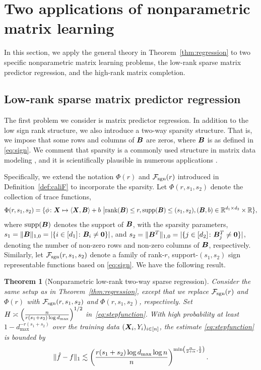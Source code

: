 \documentclass[aos]{imsart}
\newtheorem{theorem}{Theorem}%
\theoremstyle{definition}
\def\caliF{\tF_{\textup{sgn}}}
\begin{document}
\section{Two applications of nonparametric matrix learning}
\label{sec:examples}

In this section, we apply the general theory in Theorem~\ref{thm:regression} to two specific nonparametric matrix learning problems, the low-rank sparse matrix predictor regression, and the high-rank matrix completion. 



\subsection{Low-rank sparse matrix predictor regression}
\label{sec:sparse}

The first problem we consider is matrix predictor regression. In addition to the low sign rank structure, we also introduce a two-way sparsity structure. That is, we impose that some rows and columns of $\bm B$ are zeros, where $\bm B$ is as defined in \eqref{eq:sign}. We comment that sparsity is a commonly used structure in matrix data modeling \citep{zhou2014regularized}, and it is scientifically plausible in numerous applications \citep{Zhang2015}.

Specifically, we extend the notation $\Phi(r)$ and $\caliF(r)$ introduced in Definition~\ref{def:caliF} to incorporate the sparsity. Let $\Phi(r,s_1,s_2)$ denote the collection of trace functions, 
\begin{align*} 
\Phi(r,s_1,s_2)=\{\phi\colon \mX\mapsto \langle \mX, \mB \rangle +b \ \big| \text{rank}(\mB)\leq r,  \text{supp}(\mB)\leq (s_1,s_2), (\mB,b)\in\mathbb{R}^{d_1\times d_2}\times \mathbb{R}\},
\end{align*}
where $\text{supp}(\bm B)$ denotes the support of $\bm B$, with the sparsity parameters, $s_1=\lVert\bm B\rVert_{1,0}=|\{i\in[d_1]\colon \bm B_i\neq \mathbf{0}\}|$, and $s_2=\lVert\bm B^T\rVert_{1,0}=|\{j\in[d_2]\colon \bm B^T_j\neq \mathbf{0}\}|$, denoting the number of non-zero rows and non-zero columns of $\bm B$, respectively. Similarly, let $\caliF(r,s_1,s_2)$ denote a family of rank-$r$, support-$(s_1,s_2)$ sign representable functions based on \eqref{eq:sign}. We have the following result. 

\begin{theorem}[Nonparametric low-rank two-way sparse regression]\label{thm:sparse}
Consider the same setup as in Theorem~\ref{thm:regression}, except that we replace $\caliF(r)$ and $\Phi(r)$ with $\caliF(r,s_1,s_2)$ and $\Phi(r,s_1,s_2)$, respectively. Set $H\asymp {\left(n\over r(s_1+s_2)\log d_{\max}\right)}^{1/2}$ in~\eqref{eq:stepfunction}. With high probability at least $1-d_{\max}^{-r(s_1+s_2)}$ over the training data $(\bm X_i, Y_i)_{i\in[n]}$, the estimate \eqref{eq:stepfunction} is bounded by
\begin{equation}\label{eq:final2}
\onenormSize{}{\hat f- f} \lesssim \left({r(s_1+s_2) \log d_{\max}\log n \over n}\right)^{\min\left({\alpha\over 2+\alpha}, {1\over 2}\right)}.
\end{equation}
\end{theorem}
\end{document}
